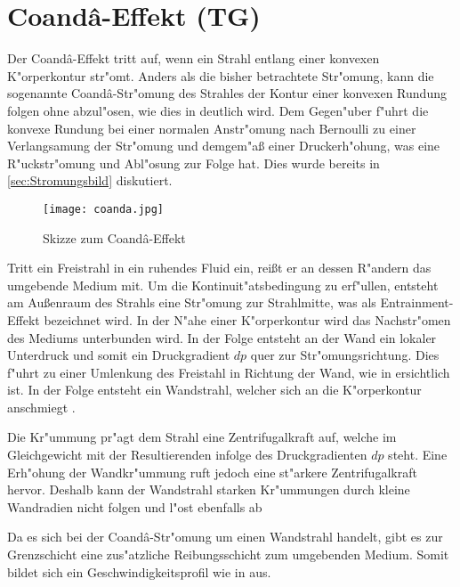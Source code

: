 \section{Coand\^{a}-Effekt (TG)}

Der Coand\^{a}-Effekt tritt auf, wenn ein Strahl entlang einer konvexen K"orperkontur str"omt. Anders als die bisher betrachtete Str"omung, kann die sogenannte Coand\^{a}-Str"omung des Strahles der Kontur einer konvexen Rundung folgen ohne abzul"osen, wie dies in  deutlich wird. Dem Gegen"uber f"uhrt die konvexe Rundung bei einer normalen Anstr"omung nach Bernoulli zu einer Verlangsamung der Str"omung und demgem"a\ss{} einer Druckerh"ohung, was eine R"uckstr"omung und Abl"osung zur Folge hat. Dies wurde bereits in \ref{sec:Stromungsbild} diskutiert.

\begin{figure}[h]
	\centering
	\texttt{[image: coanda.jpg]}
	\caption{Skizze zum Coand\^{a}-Effekt \cite{Stadlberger.2016}}
	\label{fig:coanda}
\end{figure}

Tritt ein Freistrahl in ein ruhendes Fluid ein, rei\ss{}t er an dessen R"andern das umgebende Medium mit. Um die Kontinuit"atsbedingung zu erf"ullen, entsteht am Au\ss{}enraum des Strahls eine Str"omung zur Strahlmitte, was als Entrainment-Effekt bezeichnet wird. In der N"ahe einer K"orperkontur wird das Nachstr"omen des Mediums unterbunden wird. In der Folge entsteht an der Wand ein lokaler Unterdruck und somit ein Druckgradient $dp$ quer zur Str"omungsrichtung. Dies f"uhrt zu einer Umlenkung des Freistahl in Richtung der Wand, wie in  ersichtlich ist. In der Folge entsteht ein Wandstrahl, welcher sich an die K"orperkontur anschmiegt \cite{Fernholz.1966}. 

Die Kr"ummung pr"agt dem Strahl eine Zentrifugalkraft auf, welche im Gleichgewicht mit der Resultierenden infolge des Druckgradienten $dp$ steht. Eine Erh"ohung der Wandkr"ummung ruft jedoch eine st"arkere Zentrifugalkraft hervor. Deshalb kann der Wandstrahl starken Kr"ummungen durch kleine Wandradien nicht folgen und l"ost ebenfalls ab \cite{Riedel.1971}

Da es sich bei der Coand\^{a}-Str"omung um einen Wandstrahl handelt, gibt es zur Grenzschicht eine zus"atzliche Reibungsschicht zum umgebenden Medium. Somit bildet sich ein Geschwindigkeitsprofil wie in  aus. \\

